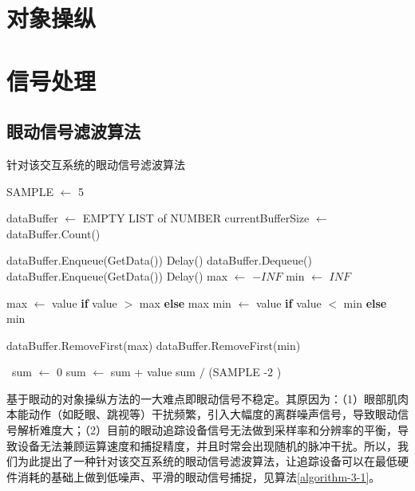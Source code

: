\section{对象操纵}\label{Manipulation}



\section{信号处理}

\subsection{眼动信号滤波算法}

\begin{algorithm}[b!]
    \caption{针对该交互系统的眼动信号滤波算法}
	\begin{algorithmic}[1]
        \State SAMPLE $\leftarrow$ 5
 
        \State dataBuffer $\leftarrow$ EMPTY LIST of NUMBER
        \State currentBufferSize $\leftarrow$ dataBuffer.Count()

            \State dataBuffer.Enqueue(GetData())
            \State Delay()
        \EndFor
        \Else
        \State dataBuffer.Dequeue()
        \State dataBuffer.Enqueue(GetData())
        \State Delay()
        \EndIf
        \State
        \State max $\leftarrow$ $-INF$
        \State min $\leftarrow$ $INF$
        
            \State max $\leftarrow$ value \textbf{if} value $>$ max \textbf{else} max
            \State min $\leftarrow$ value \textbf{if} value $<$ min \textbf{else} min
        \EndFor

        \State dataBuffer.RemoveFirst(max)
        \State dataBuffer.RemoveFirst(min)  

        \
        \State sum $\leftarrow$ 0
            \State sum $\leftarrow$ sum + value
        \EndFor
        \State \Return sum $/$ (SAMPLE -2 )
	\end{algorithmic} 
	\label{algorithm-3-1}
\end{algorithm} 

基于眼动的对象操纵方法的一大难点即眼动信号不稳定。其原因为：（1）眼部肌肉本能动作（如眨眼、跳视等）干扰频繁，引入大幅度的离群噪声信号，导致眼动信号解析难度大；（2）目前的眼动追踪设备信号无法做到采样率和分辨率的平衡，导致设备无法兼顾运算速度和捕捉精度，并且时常会出现随机的脉冲干扰。所以，我们为此提出了一种针对该交互系统的眼动信号滤波算法，让追踪设备可以在最低硬件消耗的基础上做到低噪声、平滑的眼动信号捕捉，见算法\ref{algorithm-3-1}。

